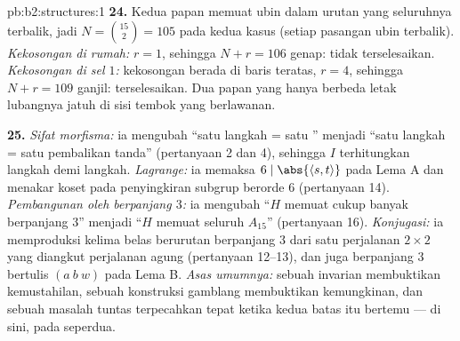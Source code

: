 \begin{solution}{pb:b2:structures:1}
\textbf{24.} Kedua papan memuat ubin dalam urutan yang seluruhnya
terbalik, jadi $N = \binom{15}{2} = 105$ pada kedua kasus (setiap
pasangan ubin terbalik). \emph{Kekosongan di rumah:} $r = 1$, sehingga
$N + r = 106$ genap: tidak terselesaikan. \emph{Kekosongan di sel $1$:}
kekosongan berada di baris teratas, $r = 4$, sehingga $N + r = 109$
ganjil: terselesaikan. Dua papan yang hanya berbeda letak lubangnya
jatuh di sisi tembok yang berlawanan.

\textbf{25.} \emph{Sifat morfisma:} ia mengubah ``satu langkah = satu
'' menjadi ``satu langkah = satu pembalikan tanda''
(pertanyaan 2 dan 4), sehingga $I$ terhitungkan langkah demi langkah.
\emph{Lagrange:} ia memaksa $6 \mid \abs{\langle s, t\rangle}$ pada Lema
A dan menakar koset pada penyingkiran subgrup berorde $6$ (pertanyaan
14). \emph{Pembangunan oleh  berpanjang $3$:} ia mengubah ``$H$
memuat cukup banyak  berpanjang $3$'' menjadi ``$H$ memuat seluruh
$A_{15}$'' (pertanyaan 16). \emph{Konjugasi:} ia memproduksi kelima
belas  berurutan berpanjang $3$ dari satu perjalanan $2 \times 2$
yang diangkut perjalanan agung (pertanyaan 12--13), dan juga 
berpanjang $3$ bertulis $(a\ b\ w)$ pada Lema B. \emph{Asas umumnya:} sebuah invarian
membuktikan kemustahilan, sebuah konstruksi gamblang membuktikan
kemungkinan, dan sebuah masalah tuntas terpecahkan tepat ketika kedua
batas itu bertemu --- di sini, pada seperdua.

\end{solution}
